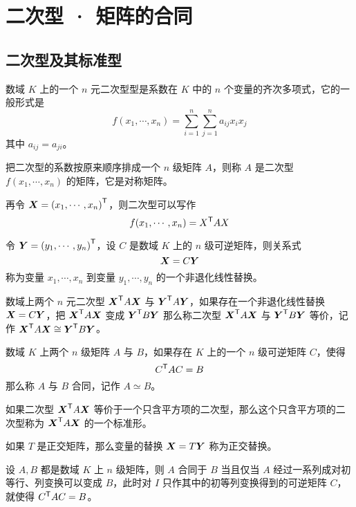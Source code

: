 \chapter{二次型 · 矩阵的合同}

\section{二次型及其标准型}

\begin{definition}
    数域 $K$ 上的一个 $n$ 元二次型型是系数在 $K$ 中的 $n$ 个变量的齐次多项式，它的一般形式是
    $$f(x_1,\cdots,x_n) = \sum_{i=1}^n\sum_{j=1}^na_{ij}x_ix_j$$
    其中 $a_{ij} = a_{ji}$。
\end{definition}

把二次型的系数按原来顺序排成一个 $n$ 级矩阵 $A$，则称 $A$ 是二次型 $f(x_1,\cdots,x_n)$ 的矩阵，它是对称矩阵。

再令 $\boldsymbol{X} = {(x_1,\cdots,x_n)}^\mathsf{T}$，则二次型可以写作
$$f(x_1,\cdots,x_n) = {X}^\mathsf{T}AX$$

令 $\boldsymbol{Y} = {(y_1,\cdots,y_n)}^\mathsf{T}$，设 $C$ 是数域 $K$ 上的 $n$ 级可逆矩阵，则关系式
$$\boldsymbol{X} = C\boldsymbol{Y}$$
称为变量 $x_1,\cdots,x_n$ 到变量 $y_1,\cdots,y_n$ 的一个非退化线性替换。

\begin{definition}
    数域上两个 $n$ 元二次型 ${\boldsymbol{X}}^\mathsf{T}A\boldsymbol{X}$ 与 ${\boldsymbol{Y}}^\mathsf{T}A\boldsymbol{Y}$，如果存在一个非退化线性替换 $\boldsymbol{X} = C\boldsymbol{Y}$，把 ${\boldsymbol{X}}^\mathsf{T}A\boldsymbol{X}$ 变成 ${\boldsymbol{Y}}^\mathsf{T}B\boldsymbol{Y}$ 那么称二次型 ${\boldsymbol{X}}^\mathsf{T}A\boldsymbol{X}$ 与 ${\boldsymbol{Y}}^\mathsf{T}B\boldsymbol{Y}$ 等价，记作 ${\boldsymbol{X}}^\mathsf{T}A\boldsymbol{X} \cong {\boldsymbol{Y}}^\mathsf{T}B\boldsymbol{Y}$。
\end{definition}

\begin{definition}
    数域 $K$ 上两个 $n$ 级矩阵 $A$ 与 $B$，如果存在 $K$ 上的一个 $n$ 级可逆矩阵 $C$，使得
    $${C}^\mathsf{T}AC = B$$
    那么称 $A$ 与 $B$ 合同，记作 $A\simeq B$。
\end{definition}

如果二次型 ${\boldsymbol{X}}^\mathsf{T} A \boldsymbol{X}$ 等价于一个只含平方项的二次型，那么这个只含平方项的二次型称为 ${\boldsymbol{X}}^\mathsf{T}A\boldsymbol{X}$ 的一个标准形。

如果 $T$ 是正交矩阵，那么变量的替换 $\boldsymbol{X} = T\boldsymbol{Y}$ 称为正交替换。

\begin{theorem}
    设 $A,B$ 都是数域 $K$ 上 $n$ 级矩阵，则 $A$ 合同于 $B$ 当且仅当 $A$ 经过一系列成对初等行、列变换可以变成 $B$，此时对 $I$ 只作其中的初等列变换得到的可逆矩阵 $C$，就使得 ${C}^\mathsf{T}AC=B$。
\end{theorem}

